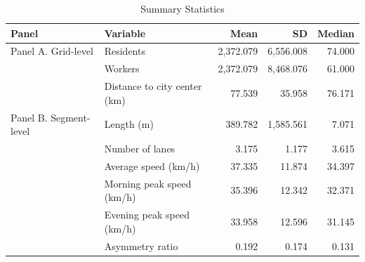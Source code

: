 \begin{table}[!htbp]
\centering
\caption{Summary Statistics}
\label{tab:summary}
\begin{tabular}{llrrr}
\toprule
Panel & Variable & Mean & SD & Median \\
\midrule
Panel A. Grid-level & Residents & 2,372.079 & 6,556.008 & 74.000 \\
 & Workers & 2,372.079 & 8,468.076 & 61.000 \\
 & Distance to city center (km) & 77.539 & 35.958 & 76.171 \\
Panel B. Segment-level & Length (m) & 389.782 & 1,585.561 & 7.071 \\
 & Number of lanes & 3.175 & 1.177 & 3.615 \\
 & Average speed (km/h) & 37.335 & 11.874 & 34.397 \\
 & Morning peak speed (km/h) & 35.396 & 12.342 & 32.371 \\
 & Evening peak speed (km/h) & 33.958 & 12.596 & 31.145 \\
 & Asymmetry ratio & 0.192 & 0.174 & 0.131 \\
\bottomrule
\end{tabular}
\end{table}
